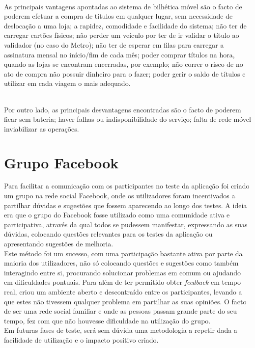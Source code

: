 ~\\As principais vantagens apontadas ao sistema de bilhética móvel são o facto de poderem efetuar a compra de títulos em qualquer lugar, sem necessidade de deslocação a uma loja; a rapidez, comodidade e facilidade do sistema; não ter de carregar cartões físicos; não perder um veículo por ter de ir validar o título ao validador (no caso do Metro); não ter de esperar em filas para carregar a assinatura mensal no início/fim de cada mês; poder comprar títulos na hora, quando as lojas se encontram encerradas, por exemplo; não correr o risco de no ato de compra não possuir dinheiro para o fazer; poder gerir o saldo de títulos e utilizar em cada viagem o mais adequado.

~\\Por outro lado, as principais desvantagens encontradas são o facto de poderem ficar sem bateria; haver falhas ou indisponibilidade do serviço; falta de rede móvel inviabilizar as operações.

\section{Grupo Facebook}

Para facilitar a comunicação com os participantes no teste da aplicação foi criado um grupo na rede social Facebook, onde os utilizadores foram incentivados a partilhar dúvidas e sugestões que fossem aparecendo ao longo dos testes. A ideia era que o grupo do Facebook fosse utilizado como uma comunidade ativa e participativa, através da qual todos se pudessem manifestar, expressando as suas dúvidas, colocando questões relevantes para os testes da aplicação ou apresentando sugestões de melhoria.
\\Este método foi um sucesso, com uma participação bastante ativa por parte da maioria dos utilizadores, não só colocando questões e sugestões como também interagindo entre si, procurando solucionar problemas em comum ou ajudando em dificuldades pontuais. Para além de ter permitido obter \emph{feedback} em tempo real, criou um ambiente aberto e descontraído entre os participantes, levando a que estes não tivessem qualquer problema em partilhar as suas opiniões. O facto de ser uma rede social familiar e onde as pessoas passam grande parte do seu tempo, fez com que não houvesse dificuldade na utilização do grupo.
\\Em futuras fases de teste, será sem dúvida uma metodologia a repetir dada a facilidade de utilização e o impacto positivo criado.

